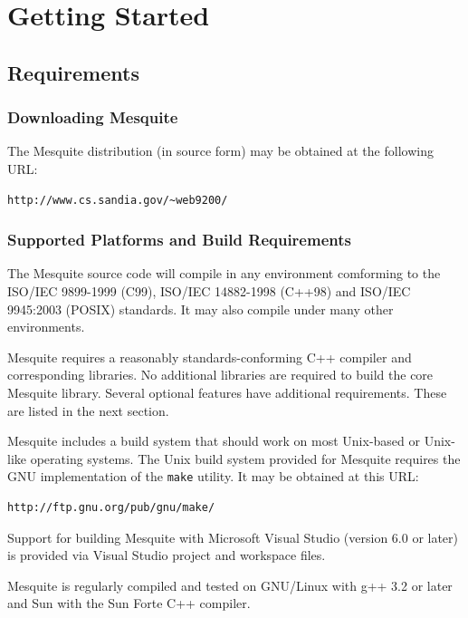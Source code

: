\chapter{Getting Started} \label{sec:basics}

\section{Requirements}

\subsection{Downloading Mesquite}
The Mesquite distribution (in source form) may be obtained at the following URL:
\begin{verbatim}
http://www.cs.sandia.gov/~web9200/
\end{verbatim}

\subsection{Supported Platforms and Build Requirements}
The Mesquite source code will compile in any environment comforming to the ISO/IEC 9899-1999 (C99), ISO/IEC 14882-1998 (C++98) and ISO/IEC 9945:2003 (POSIX) standards.
It may also compile under many other environments.

Mesquite requires a reasonably standards-conforming C++ compiler and corresponding libraries.  No additional libraries are required to build the core Mesquite library.
Several optional features have additional requirements.  These are listed in the next section.

Mesquite includes a build system that should work on most Unix-based or Unix-like
operating systems.  The Unix build system provided for Mesquite requires the GNU implementation of the \texttt{make} utility.  It may be obtained at this URL:
\begin{verbatim}
http://ftp.gnu.org/pub/gnu/make/
\end{verbatim}

Support for building Mesquite with Microsoft Visual Studio (version 6.0 or later) is provided via Visual Studio project and workspace files.

Mesquite is regularly compiled and tested on GNU/Linux with g++ 3.2 or later and Sun with the Sun Forte C++ compiler.  

